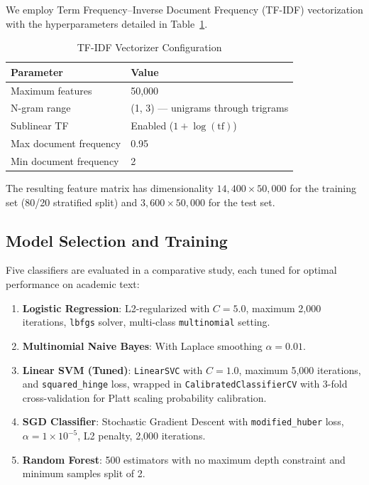 \documentclass[conference]{IEEEtran}
\begin{document}
We employ Term Frequency--Inverse Document Frequency (TF-IDF) vectorization with the hyperparameters detailed in Table~\ref{tab:tfidf}.

\begin{table}[htbp]
\caption{TF-IDF Vectorizer Configuration}
\label{tab:tfidf}
\centering
\begin{tabular}{@{}ll@{}}
\toprule
\textbf{Parameter} & \textbf{Value} \\
\midrule
Maximum features & 50,000 \\
N-gram range & (1, 3) --- unigrams through trigrams \\
Sublinear TF & Enabled ($1 + \log(\text{tf})$) \\
Max document frequency & 0.95 \\
Min document frequency & 2 \\
\bottomrule
\end{tabular}
\end{table}

The resulting feature matrix has dimensionality $14{,}400 \times 50{,}000$ for the training set (80/20 stratified split) and $3{,}600 \times 50{,}000$ for the test set.

\subsection{Model Selection and Training}

Five classifiers are evaluated in a comparative study, each tuned for optimal performance on academic text:

\begin{enumerate}
    \item \textbf{Logistic Regression}: L2-regularized with $C=5.0$, maximum 2,000 iterations, \texttt{lbfgs} solver, multi-class \texttt{multinomial} setting.
    \item \textbf{Multinomial Naive Bayes}: With Laplace smoothing $\alpha = 0.01$.
    \item \textbf{Linear SVM (Tuned)}: \texttt{LinearSVC} with $C=1.0$, maximum 5,000 iterations, and \texttt{squared\_hinge} loss, wrapped in \texttt{CalibratedClassifierCV} with 3-fold cross-validation for Platt scaling probability calibration.
    \item \textbf{SGD Classifier}: Stochastic Gradient Descent with \texttt{modified\_huber} loss, $\alpha = 1 \times 10^{-5}$, L2 penalty, 2,000 iterations.
    \item \textbf{Random Forest}: 500 estimators with no maximum depth constraint and minimum samples split of 2.
\end{enumerate}
\end{document}
